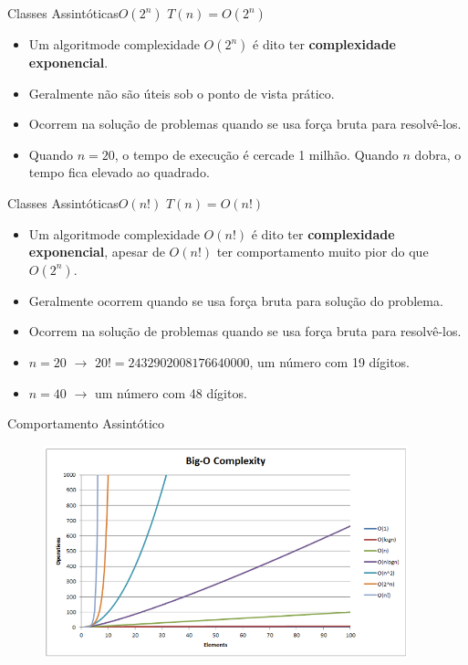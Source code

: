 \documentclass[aspectratio=169]{beamer}
\begin{document}

\begin{frame}{Classes Assintóticas}{$O(2^n)$}
$T(n) = O(2^n)$
\begin{itemize}
 \item Um algoritmode complexidade $O(2^n)$ é dito ter {\bf complexidade exponencial}.
 \item Geralmente não são úteis sob o ponto de vista prático.
 \item Ocorrem na solução de problemas quando se usa força bruta para resolvê-los.
 \item Quando $n=20$, o tempo de execução é cercade 1 milhão. Quando $n$ dobra, o tempo fica elevado ao quadrado.
 \end{itemize}
\end{frame}



\begin{frame}{Classes Assintóticas}{$O(n!)$}
$T(n) = O(n!)$
\begin{itemize}
 \item Um algoritmode complexidade $O(n!)$ é dito ter {\bf complexidade exponencial}, apesar de $O(n!)$ ter comportamento muito pior do que $O(2^n)$.
 \item Geralmente ocorrem quando se usa força bruta para solução do problema.
 \item Ocorrem na solução de problemas quando se usa força bruta para resolvê-los.
 \item $n=20$ $\rightarrow$ $20! = 2432902008176640000$, um número com 19 dígitos.
 \item $n=40$ $\rightarrow$ um número com 48 dígitos.
 \end{itemize}
\end{frame}



\begin{frame}{Comportamento Assintótico}
\begin{figure}[!ht]
  \includegraphics[width=300pt]{imgs/comparativo_complexidade.png}
\end{figure} 
\end{frame}
\end{document}
